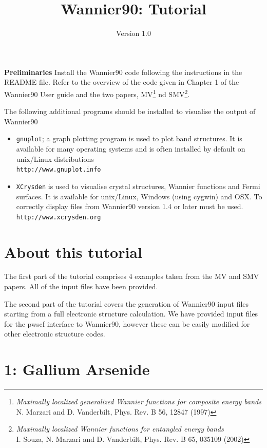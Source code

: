 \documentclass[a4paper,11pt,twoside]{article}
\title{Wannier90: Tutorial}
\author{Version 1.0}
\begin{document}
\maketitle

{\bf Preliminaries}
Install the Wannier90 code following the instructions in the README file.
Refer to the overview of the code given in Chapter 1 of the Wannier90 User guide
and the two papers, MV\footnote{{\it Maximally localized generalized Wannier functions for composite energy bands}\\ N. Marzari and D. Vanderbilt, Phys. Rev. B 56, 12847 (1997)}
nd SMV\footnote{{\it Maximally localized Wannier functions for entangled energy bands}\\
I. Souza, N. Marzari and D. Vanderbilt, Phys. Rev. B 65, 035109 (2002)}.


The following additional programs should be installed to visualise the output of Wannier90
\begin{itemize}
\item {\tt gnuplot}; a graph plotting program is used to plot band structures. It is 
available for many operating systems and is often installed by default on
 unix/Linux distributions\\
{\tt http://www.gnuplot.info}
\item {\tt XCrysden} is used to visualise crystal structures, Wannier functions and Fermi
surfaces. It is available for unix/Linux, Windows (using cygwin) and OSX. To correctly display
files from Wannier90 version 1.4 or later must be used.\\
{\tt http://www.xcrysden.org}
\end{itemize}



\section*{About this tutorial}

The first part of the tutorial comprises 4 examples taken from the MV and SMV papers.
All of the input files have been provided.

The second part of the tutorial covers the generation of Wannier90 input files
starting from a full electronic structure calculation. We have provided input files for the pwscf
interface to Wannier90, however these can be easily modified for other electronic structure
codes.

\cleardoublepage

\section*{1: Gallium Arsenide}
\end{document}
